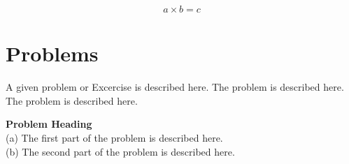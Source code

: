 \begin{equation}
a \times b = c
\end{equation}
\section{Problems}
%
\begin{prob}
\label{prob1}
A given problem or Excercise is described here. The
problem is described here. The problem is described here.
\end{prob}

\begin{prob}
\label{prob2}
\textbf{Problem Heading}\\
(a) The first part of the problem is described here.\\
(b) The second part of the problem is described here.
\end{prob}

